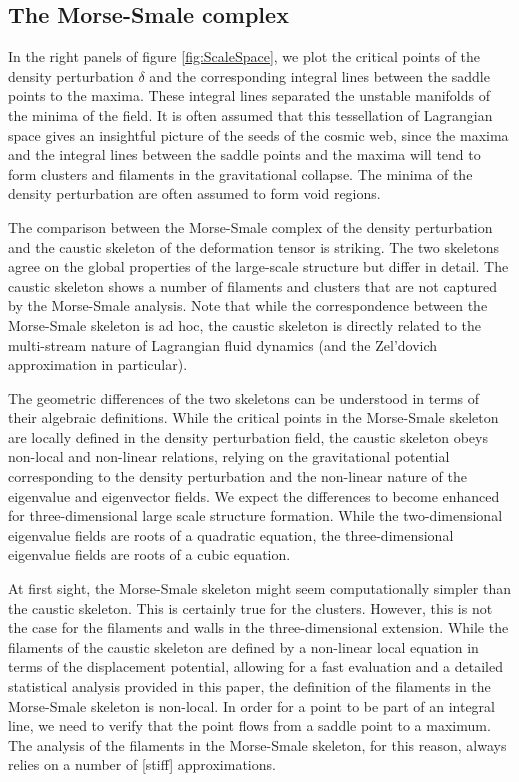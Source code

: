 \documentclass[a4paper, 11pt]{article}
\begin{document}
\subsection{The Morse-Smale complex}
In the right panels of figure \ref{fig:ScaleSpace}, we plot the critical points of the density perturbation $\delta$ and the corresponding integral lines between the saddle points to the maxima. These integral lines separated the unstable manifolds of the minima of the field. It is often assumed that this tessellation of Lagrangian space gives an insightful picture of the seeds of the cosmic web, since the maxima and the integral lines between the saddle points and the maxima will tend to form clusters and filaments in the gravitational collapse. The minima of the density perturbation are often assumed to form void regions.

The comparison between the Morse-Smale complex of the density perturbation and the caustic skeleton of the deformation tensor is striking. The two skeletons agree on the global properties of the large-scale structure but differ in detail. The caustic skeleton shows a number of filaments and clusters that are not captured by the Morse-Smale analysis. Note that while the correspondence between the Morse-Smale skeleton is ad hoc, the caustic skeleton is directly related to the multi-stream nature of Lagrangian fluid dynamics (and the Zel'dovich approximation in particular).

The geometric differences of the two skeletons can be understood in terms of their algebraic definitions. While the critical points in the Morse-Smale skeleton are locally defined in the density perturbation field, the caustic skeleton obeys non-local and non-linear relations, relying on the gravitational potential corresponding to the density perturbation and the non-linear nature of the eigenvalue and eigenvector fields. We expect the differences to become enhanced for three-dimensional large scale structure formation. While the two-dimensional eigenvalue fields are roots of a quadratic equation, the three-dimensional eigenvalue fields are roots of a cubic equation.

At first sight, the Morse-Smale skeleton might seem computationally simpler than the caustic skeleton. This is certainly true for the clusters. However, this is not the case for the filaments and walls in the three-dimensional extension. While the filaments of the caustic skeleton are defined by a non-linear local equation in terms of the displacement potential, allowing for a fast evaluation and a detailed statistical analysis provided in this paper, the definition of the filaments in the Morse-Smale skeleton is non-local. In order for a point to be part of an integral line, we need to verify that the point flows from a saddle point to a maximum. The analysis of the filaments in the Morse-Smale skeleton, for this reason, always relies on a number of [stiff] approximations.
\end{document}
